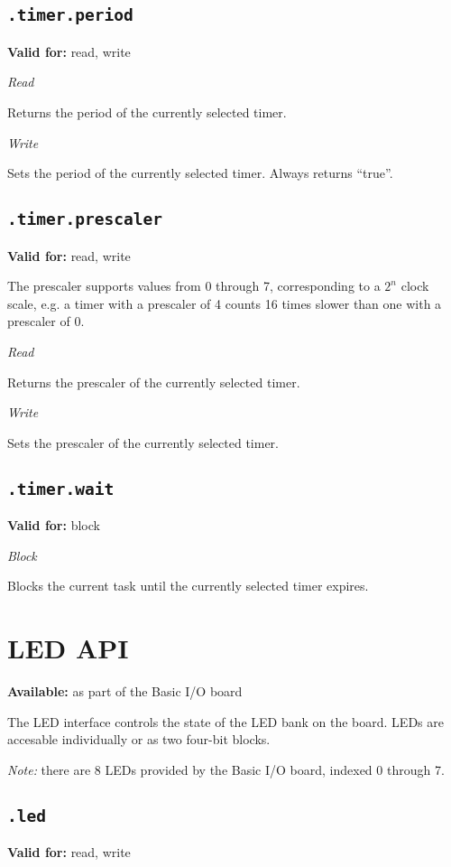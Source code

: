 \documentclass{article}
\begin{document}
\subsection{\texttt{.timer.period}}
\textbf{Valid for:} read, write

\textit{Read}

Returns the period of the currently selected timer.

\textit{Write}

Sets the period of the currently selected timer. Always returns ``true''.

\subsection{\texttt{.timer.prescaler}}
\textbf{Valid for:} read, write

The prescaler supports values from 0 through 7, corresponding to a $2^n$ clock scale, e.g. a timer with a prescaler of 4 counts 16 times slower than one with a prescaler of 0.

\textit{Read}

Returns the prescaler of the currently selected timer.

\textit{Write}

Sets the prescaler of the currently selected timer.

\subsection{\texttt{.timer.wait}}
\textbf{Valid for:} block

\textit{Block}

Blocks the current task until the currently selected timer expires.

\section{LED API}
\textbf{Available:} as part of the Basic I/O board

The LED interface controls the state of the LED bank on the board. LEDs are accesable individually or as two four-bit blocks.

\textit{Note:} there are 8 LEDs provided by the Basic I/O board, indexed 0 through 7.

\subsection{\texttt{.led}}
\textbf{Valid for:} read, write
\end{document}
